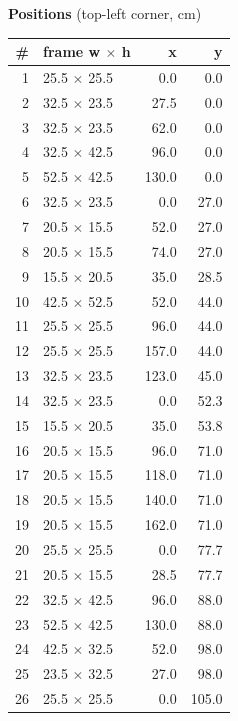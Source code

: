 \documentclass[a4paper,landscape,10pt]{article}
\begin{document}
\begin{minipage}[t]{0.25\textwidth}
\vspace{8pt}
{\bfseries Positions} (top-left corner, cm)\\[2pt]
\tiny
\begin{tabular}{@{}r l r r@{}}
\toprule
\# & frame w $\times$ h & x & y \\
\midrule
1 & 25.5 $\times$ 25.5 & 0.0 & 0.0 \\
2 & 32.5 $\times$ 23.5 & 27.5 & 0.0 \\
3 & 32.5 $\times$ 23.5 & 62.0 & 0.0 \\
4 & 32.5 $\times$ 42.5 & 96.0 & 0.0 \\
5 & 52.5 $\times$ 42.5 & 130.0 & 0.0 \\
6 & 32.5 $\times$ 23.5 & 0.0 & 27.0 \\
7 & 20.5 $\times$ 15.5 & 52.0 & 27.0 \\
8 & 20.5 $\times$ 15.5 & 74.0 & 27.0 \\
9 & 15.5 $\times$ 20.5 & 35.0 & 28.5 \\
10 & 42.5 $\times$ 52.5 & 52.0 & 44.0 \\
11 & 25.5 $\times$ 25.5 & 96.0 & 44.0 \\
12 & 25.5 $\times$ 25.5 & 157.0 & 44.0 \\
13 & 32.5 $\times$ 23.5 & 123.0 & 45.0 \\
14 & 32.5 $\times$ 23.5 & 0.0 & 52.3 \\
15 & 15.5 $\times$ 20.5 & 35.0 & 53.8 \\
16 & 20.5 $\times$ 15.5 & 96.0 & 71.0 \\
17 & 20.5 $\times$ 15.5 & 118.0 & 71.0 \\
18 & 20.5 $\times$ 15.5 & 140.0 & 71.0 \\
19 & 20.5 $\times$ 15.5 & 162.0 & 71.0 \\
20 & 25.5 $\times$ 25.5 & 0.0 & 77.7 \\
21 & 20.5 $\times$ 15.5 & 28.5 & 77.7 \\
22 & 32.5 $\times$ 42.5 & 96.0 & 88.0 \\
23 & 52.5 $\times$ 42.5 & 130.0 & 88.0 \\
24 & 42.5 $\times$ 32.5 & 52.0 & 98.0 \\
25 & 23.5 $\times$ 32.5 & 27.0 & 98.0 \\
26 & 25.5 $\times$ 25.5 & 0.0 & 105.0 \\
\bottomrule
\end{tabular}
\end{minipage}
\clearpage
\end{document}

